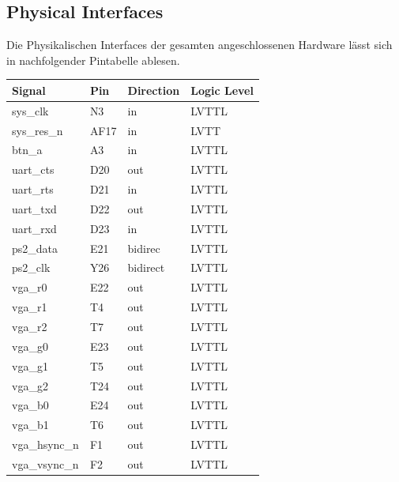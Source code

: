 \subsection{Physical Interfaces}
Die Physikalischen Interfaces der gesamten angeschlossenen Hardware lässt sich
in nachfolgender Pintabelle ablesen.
\begin{table}[!ht]
 \begin{center}
  \begin{tabular}{|l|l|l|l|}
   \hline Signal & Pin &Direction &Logic Level\\
   \hline
   sys\_clk & N3 & in & LVTTL\\
   sys\_res\_n & AF17 & in & LVTT\\
   btn\_a & A3 & in & LVTTL\\
   uart\_cts & D20 & out & LVTTL\\
   uart\_rts & D21 & in & LVTTL\\
   uart\_txd & D22 & out & LVTTL\\
   uart\_rxd & D23 & in & LVTTL\\
   ps2\_data & E21 & bidirec & LVTTL\\
   ps2\_clk & Y26 & bidirect & LVTTL\\
   vga\_r0 & E22 & out & LVTTL\\
   vga\_r1 & T4 & out & LVTTL\\
   vga\_r2 & T7 & out & LVTTL\\
   vga\_g0 & E23 & out & LVTTL\\
   vga\_g1 & T5 & out & LVTTL\\
   vga\_g2 & T24 & out & LVTTL\\
   vga\_b0 & E24 & out & LVTTL\\
   vga\_b1 & T6 & out & LVTTL\\
   vga\_hsync\_n & F1 & out & LVTTL\\
   vga\_vsync\_n & F2 & out & LVTTL\\
   \hline
  \end{tabular}
 \end{center}
\end{table}

\newpage
